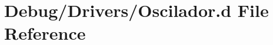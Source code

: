 \hypertarget{Oscilador_8d}{}\section{Debug/\+Drivers/\+Oscilador.d File Reference}
\label{Oscilador_8d}
